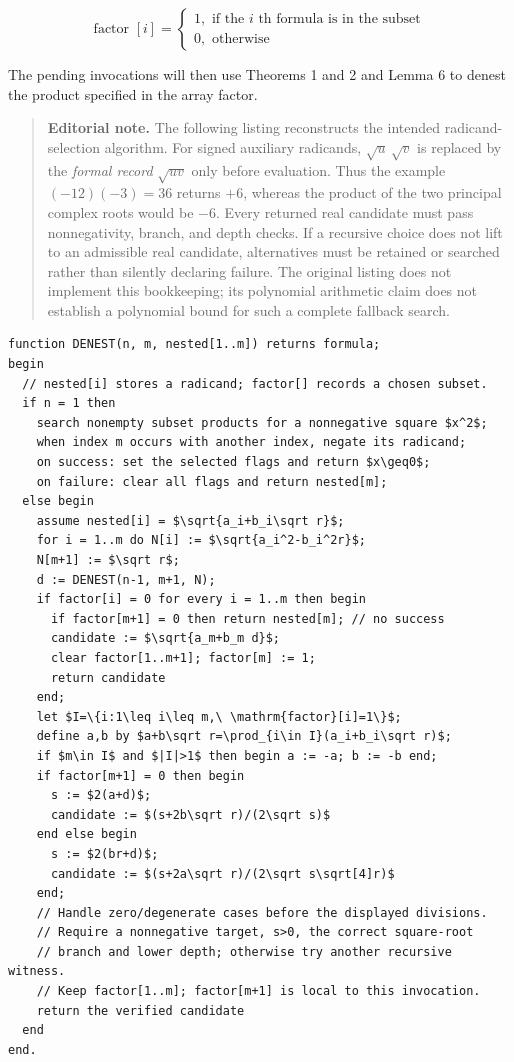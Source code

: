 \documentclass[11pt,letterpaper]{article}
\newcommand{\editorialnote}[1]{\begin{quote}\small\noindent
  \textbf{Editorial note.} #1\end{quote}}
\begin{document}
\[
\text { factor }[i]=\left\{\begin{array}{l}
1, \text { if the } i \text { th formula is in the subset } \\
0, \text { otherwise }
\end{array}\right.
\]

The pending invocations will then use Theorems 1 and 2 and Lemma 6 to denest the product specified in the array factor.

\editorialnote{The following listing reconstructs the intended radicand-selection algorithm. For signed auxiliary radicands, $\sqrt u\,\sqrt v$ is replaced by the \emph{formal record} $\sqrt{uv}$ only before evaluation. Thus the example $(-12)(-3)=36$ returns $+6$, whereas the product of the two principal complex roots would be $-6$. Every returned real candidate must pass nonnegativity, branch, and depth checks. If a recursive choice does not lift to an admissible real candidate, alternatives must be retained or searched rather than silently declaring failure. The original listing does not implement this bookkeeping; its polynomial arithmetic claim does not establish a polynomial bound for such a complete fallback search.}

\begin{lstlisting}[mathescape=true,basicstyle=\ttfamily\footnotesize]
function DENEST(n, m, nested[1..m]) returns formula;
begin
  // nested[i] stores a radicand; factor[] records a chosen subset.
  if n = 1 then
    search nonempty subset products for a nonnegative square $x^2$;
    when index m occurs with another index, negate its radicand;
    on success: set the selected flags and return $x\geq0$;
    on failure: clear all flags and return nested[m];
  else begin
    assume nested[i] = $\sqrt{a_i+b_i\sqrt r}$;
    for i = 1..m do N[i] := $\sqrt{a_i^2-b_i^2r}$;
    N[m+1] := $\sqrt r$;
    d := DENEST(n-1, m+1, N);
    if factor[i] = 0 for every i = 1..m then begin
      if factor[m+1] = 0 then return nested[m]; // no success
      candidate := $\sqrt{a_m+b_m d}$;
      clear factor[1..m+1]; factor[m] := 1;
      return candidate
    end;
    let $I=\{i:1\leq i\leq m,\ \mathrm{factor}[i]=1\}$;
    define a,b by $a+b\sqrt r=\prod_{i\in I}(a_i+b_i\sqrt r)$;
    if $m\in I$ and $|I|>1$ then begin a := -a; b := -b end;
    if factor[m+1] = 0 then begin
      s := $2(a+d)$;
      candidate := $(s+2b\sqrt r)/(2\sqrt s)$
    end else begin
      s := $2(br+d)$;
      candidate := $(s+2a\sqrt r)/(2\sqrt s\sqrt[4]r)$
    end;
    // Handle zero/degenerate cases before the displayed divisions.
    // Require a nonnegative target, s>0, the correct square-root
    // branch and lower depth; otherwise try another recursive witness.
    // Keep factor[1..m]; factor[m+1] is local to this invocation.
    return the verified candidate
  end
end.
\end{lstlisting}
\end{document}
